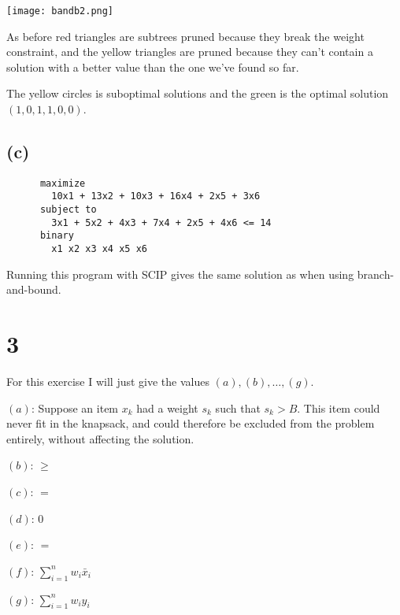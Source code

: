 \documentclass[12pt]{report}
\begin{document}
    \texttt{[image: bandb2.png]}

    As before red triangles are subtrees pruned because they break the weight constraint, and the yellow triangles are pruned because they can't contain a solution with a better value than the one we've found so far.

    The yellow circles is suboptimal solutions and the green is the optimal solution $(1,0,1,1,0,0)$.



  \subsection*{(c)}
    \begin{verbatim}
      maximize
        10x1 + 13x2 + 10x3 + 16x4 + 2x5 + 3x6
      subject to
        3x1 + 5x2 + 4x3 + 7x4 + 2x5 + 4x6 <= 14
      binary
        x1 x2 x3 x4 x5 x6
    \end{verbatim}

    Running this program with SCIP gives the same solution as when using branch-and-bound.
\section*{3}
For this exercise I will just give the values $(a),(b), \ldots , (g)$.

$(a)$: Suppose an item $x_k$ had a weight $s_k$ such that $s_k > B$. This item could never fit in the knapsack, and could therefore be excluded from the problem entirely, without affecting the solution.

$(b)$: $\ge$

$(c)$: $=$

$(d)$: $0$

$(e)$: $=$

$(f)$: $\sum_{i=1}^n w_i \bar{x}_i$

$(g)$: $\sum_{i=1}^n w_i y_i$
\end{document}
